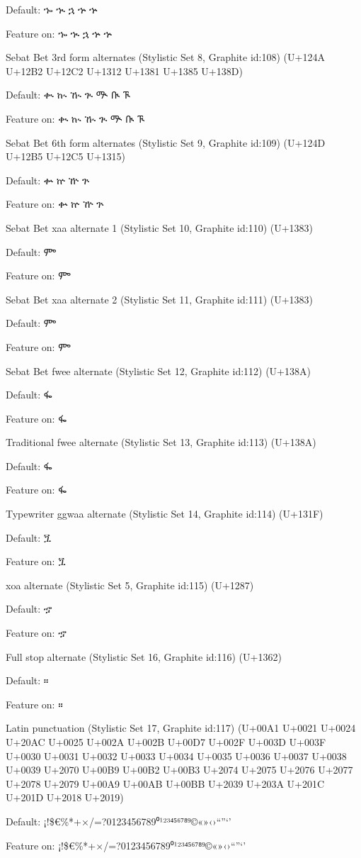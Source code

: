 \IndSS Default:		ኈ ኊ ኋ ኍ ኍ

\IndSS\xwa Feature on:	ኈ ኊ ኋ ኍ ኍ

\StylisticSet Sebat Bet 3rd form alternates (Stylistic Set 8, Graphite id:108) (U+124A U+12B2 U+12C2 U+1312 U+1381 U+1385 U+138D)

\IndSS Default:		ቊ ኲ ዂ ጒ ᎁ ᎅ ᎍ

\IndSS\SBThree Feature on:	ቊ ኲ ዂ ጒ ᎁ ᎅ ᎍ

\StylisticSet Sebat Bet 6th form alternates (Stylistic Set 9, Graphite id:109) (U+124D U+12B5 U+12C5 U+1315)

\IndSS Default:		ቍ ኵ ዅ ጕ

\IndSS\SBSix Feature on:	ቍ ኵ ዅ ጕ

\StylisticSet Sebat Bet xaa alternate 1 (Stylistic Set 10, Graphite id:110) (U+1383)

\IndSS Default:		ᎃ

\IndSS\xaaOne Feature on:	ᎃ

\StylisticSet Sebat Bet xaa alternate 2 (Stylistic Set 11, Graphite id:111) (U+1383)

\IndSS Default:		ᎃ

\IndSS\xaaTwo Feature on:	ᎃ

\StylisticSet Sebat Bet fwee alternate (Stylistic Set 12, Graphite id:112) (U+138A)

\IndSS Default:		ᎊ

\IndSS\SBfwee Feature on:	ᎊ

\StylisticSet Traditional fwee alternate (Stylistic Set 13, Graphite id:113) (U+138A)

\IndSS Default:		ᎊ

\IndSS\fwee Feature on:	ᎊ

\StylisticSet  Typewriter ggwaa alternate (Stylistic Set 14, Graphite id:114) (U+131F)

\IndSS Default:		ጟ

\IndSS\ggwaa Feature on:	ጟ

\StylisticSet xoa alternate (Stylistic Set 5, Graphite id:115) (U+1287)

\IndSS Default:		ኇ

\IndSS\xoa Feature on:	ኇ

\StylisticSet Full stop alternate (Stylistic Set 16, Graphite id:116) (U+1362)

\IndSS Default:		።

\IndSS\Fullstop Feature on:	።


\StylisticSet Latin punctuation (Stylistic Set 17, Graphite id:117) (U+00A1 U+0021 U+0024 U+20AC U+0025 U+002A U+002B U+00D7 U+002F U+003D U+003F U+0030 U+0031 U+0032 U+0033 U+0034 U+0035 U+0036 U+0037 U+0038 U+0039 U+2070 U+00B9 U+00B2 U+00B3 U+2074 U+2075 U+2076 U+2077 U+2078 U+2079 U+00A9 U+00AB U+00BB U+2039 U+203A U+201C U+201D U+2018 U+2019)

\IndSS Default:		¡!\$€\%*+×/=?0123456789⁰¹²³⁴⁵⁶⁷⁸⁹©«»‹›“”‘’

\Punct Feature on:	¡!\$€\%*+×/=?0123456789⁰¹²³⁴⁵⁶⁷⁸⁹©«»‹›“”‘’

\bye
